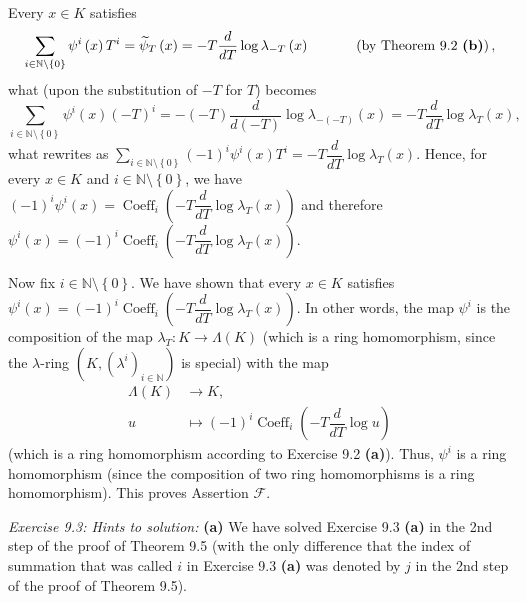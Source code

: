 \documentclass[numbers=enddot,12pt,final,onecolumn,notitlepage]{scrartcl}%
\begin{document}
Every $x\in K$ satisfies%
\[
\sum\limits_{i\in\mathbb{N}\setminus\left\{  0\right\}  }\psi^{i}\left(
x\right)  T^{i}=\widetilde{\psi}_{T}\left(  x\right)  =-T\dfrac{d}{dT}%
\log\lambda_{-T}\left(  x\right)  \ \ \ \ \ \ \ \ \ \ \left(  \text{by Theorem
9.2 \textbf{(b)}}\right)  ,
\]
what (upon the substitution of $-T$ for $T$) becomes%
\[
\sum\limits_{i\in\mathbb{N}\setminus\left\{  0\right\}  }\psi^{i}\left(
x\right)  \left(  -T\right)  ^{i}=-\left(  -T\right)  \dfrac{d}{d\left(
-T\right)  }\log\lambda_{-\left(  -T\right)  }\left(  x\right)  =-T\dfrac
{d}{dT}\log\lambda_{T}\left(  x\right)  ,
\]
what rewrites as $\sum\limits_{i\in\mathbb{N}\setminus\left\{  0\right\}
}\left(  -1\right)  ^{i}\psi^{i}\left(  x\right)  T^{i}=-T\dfrac{d}{dT}%
\log\lambda_{T}\left(  x\right)  $. Hence, for every $x\in K$ and
$i\in\mathbb{N}\setminus\left\{  0\right\}  $, we have $\left(  -1\right)
^{i}\psi^{i}\left(  x\right)  =\operatorname*{Coeff}\nolimits_{i}\left(
-T\dfrac{d}{dT}\log\lambda_{T}\left(  x\right)  \right)  $ and therefore
$\psi^{i}\left(  x\right)  =\left(  -1\right)  ^{i}\operatorname*{Coeff}%
\nolimits_{i}\left(  -T\dfrac{d}{dT}\log\lambda_{T}\left(  x\right)  \right)
$.

Now fix $i\in\mathbb{N}\setminus\left\{  0\right\}  $. We have shown that
every $x\in K$ satisfies $\psi^{i}\left(  x\right)  =\left(  -1\right)
^{i}\operatorname*{Coeff}\nolimits_{i}\left(  -T\dfrac{d}{dT}\log\lambda
_{T}\left(  x\right)  \right)  $. In other words, the map $\psi^{i}$ is the
composition of the map $\lambda_{T}:K\rightarrow\Lambda\left(  K\right)  $
(which is a ring homomorphism, since the $\lambda$-ring $\left(  K,\left(
\lambda^{i}\right)  _{i\in\mathbb{N}}\right)  $ is special) with the map%
\begin{align*}
\Lambda\left(  K\right)   &  \rightarrow K,\\
u  &  \mapsto\left(  -1\right)  ^{i}\operatorname*{Coeff}\nolimits_{i}\left(
-T\dfrac{d}{dT}\log u\right)
\end{align*}
(which is a ring homomorphism according to Exercise 9.2 \textbf{(a)}). Thus,
$\psi^{i}$ is a ring homomorphism (since the composition of two ring
homomorphisms is a ring homomorphism). This proves Assertion $\mathcal{F}$.

\textit{Exercise 9.3: Hints to solution:} \textbf{(a)} We have solved Exercise
9.3 \textbf{(a)} in the 2nd step of the proof of Theorem 9.5 (with the only
difference that the index of summation that was called $i$ in Exercise 9.3
\textbf{(a)} was denoted by $j$ in the 2nd step of the proof of Theorem 9.5).
\end{document}
